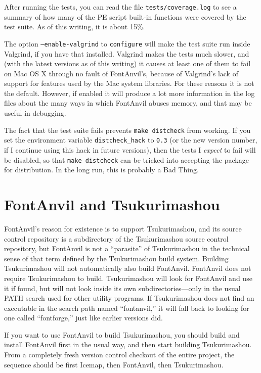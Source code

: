 After running the tests, you can read the file \texttt{tests/coverage.log}
to see a summary of how many of the PE script built-in functions were
covered by the test suite.  As of this writing, it is about 15\%.

The option \texttt{--enable-valgrind} to \texttt{configure} will make the
test suite run inside Valgrind, if you have that installed.  Valgrind
makes the tests much slower, and (with the latest versions as of this
writing) it causes at least one of them to fail on Mac OS X through no fault
of FontAnvil's, because of Valgrind's lack of support for features used by
the Mac system libraries.  For these reasons it is not the default. 
However, if enabled it will produce a lot more information in the log files
about the many ways in which FontAnvil abuses memory, and that may be useful
in debugging.

The fact that the test suite fails prevents \texttt{make distcheck} from
working.  If you set the environment variable \texttt{distcheck\_hack} to
\texttt{0.3} (or the new version number, if I continue using this hack in
future versions), then the tests I \emph{expect} to fail will be disabled,
so that \texttt{make distcheck} can be tricked into accepting the package
for distribution.  In the long run, this is probably a Bad Thing.

\section{FontAnvil and Tsukurimashou}

FontAnvil's reason for existence is to support Tsukurimashou, and its source
control repository is a subdirectory of the Tsukurimashou source control
repository, but FontAnvil is not a ``parasite'' of Tsukurimashou in the
technical sense of that term defined by the Tsukurimashou build system. 
Building Tsukurimashou will not automatically also build FontAnvil.
FontAnvil does not require Tsukurimashou to build.  Tsukurimashou will look
for FontAnvil and use it if found, but will not look inside its own
subdirectories---only in the usual PATH search used for other utility
programs.  If Tsukurimashou does not find an executable in the search path
named ``fontanvil,'' it will fall back to looking for one called
``fontforge,'' just like earlier versions did.

If you want to use FontAnvil to build Tsukurimashou, you should build and
install FontAnvil first in the usual way, and then start building
Tsukurimashou.  From a completely fresh version control checkout of the
entire project, the sequence should be first Icemap, then FontAnvil, then
Tsukurimashou.

